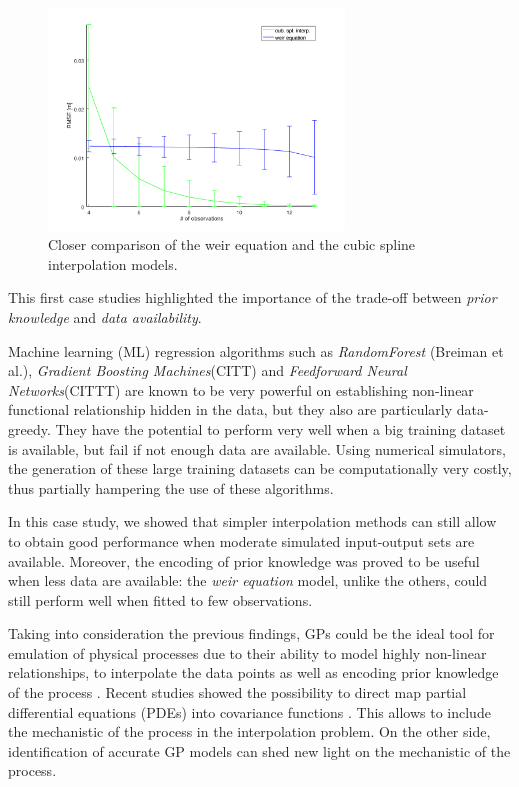 \begin{figure}[h]
  \centering
  \includegraphics[width=0.7\textwidth]{Figures/fitting_std.png}
  \caption{Closer comparison of the weir equation and the cubic spline interpolation models.}
  \label{fig:fitting_std}
\end{figure}


This first case studies highlighted the importance of the trade-off between \emph{prior knowledge} and \emph{data availability}.

Machine learning (ML) regression algorithms such as \emph{RandomForest} (Breiman et al.), \emph{Gradient Boosting Machines}(CITT) and \emph{Feedforward Neural Networks}(CITTT) are known to be very powerful on establishing non-linear functional relationship hidden in the data, but they also are particularly data-greedy. They have the potential to perform very well when a big training dataset is available, but fail if not enough data are available. Using numerical simulators, the generation of these large training datasets can be computationally very costly, thus partially hampering the use of these algorithms.

In this case study, we showed that simpler interpolation methods can still allow to obtain good performance when  moderate simulated input-output sets are available. 
Moreover, the encoding of prior knowledge was proved to be useful when less data are available: the \emph{weir equation} model, unlike the others, could still perform well when fitted to few observations.

Taking into consideration the previous findings, GPs could be the ideal tool for emulation of physical processes due to their ability to model highly non-linear relationships, to interpolate the data points as well as encoding prior knowledge of the process \autocite{rasmussen_gaussian_2010}. Recent studies showed the possibility to direct map partial differential equations (PDEs) into covariance functions \autocite{lindgren_an_explicit_2011}. This allows to include the mechanistic of the process in the interpolation problem. On the other side, identification of accurate GP models can shed new light on the mechanistic of the process.

